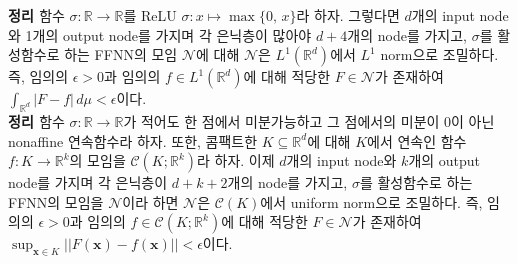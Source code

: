 \documentclass[10pt,onecolumn,twoside,a4size]{gsag3jnl}
\begin{document}
\noindent\textsf{\textbf{정리 \citep{hanin2017approximating}} 함수 $\sigma:\mathbb{R}\to\mathbb{R}$를 ReLU $\sigma:x\mapsto\max\{0,\,x\}$라 하자. 그렇다면 $d$개의 input node와 1개의 output node를 가지며 각 은닉층이 많아야 $d+4$개의 node를 가지고, $\sigma$를 활성함수로 하는 FFNN의 모임 $\mathcal{N}$에 대해 $\mathcal{N}$은 $L^1(\mathbb{R}^d)$에서 $L^1$ norm으로 조밀하다. 즉, 임의의 $\epsilon>0$과 임의의 $f\in L^1(\mathbb{R}^d)$에 대해 적당한 $F\in\mathcal{N}$가 존재하여 $\int_{\mathbb{R}^d}|F-f|\,d\mu<\epsilon$이다.}\\

\noindent\textsf{\textbf{정리 \citep{kidger2019universal}} 함수 $\sigma:\mathbb{R}\to\mathbb{R}$가 적어도 한 점에서 미분가능하고 그 점에서의 미분이 0이 아닌 nonaffine 연속함수라 하자. 또한, 콤팩트한 $K\subseteq\mathbb{R}^d$에 대해 $K$에서 연속인 함수 $f:K\to\mathbb{R}^k$의 모임을 $\mathcal{C}(K;\mathbb{R}^k)$라 하자. 이제 $d$개의 input node와 $k$개의 output node를 가지며 각 은닉층이 $d+k+2$개의 node를 가지고, $\sigma$를 활성함수로 하는 FFNN의 모임을 $\mathcal{N}$이라 하면 $\mathcal{N}$은 $\mathcal{C}(K)$에서 uniform norm으로 조밀하다. 즉, 임의의 $\epsilon>0$과 임의의 $f\in\mathcal{C}(K;\mathbb{R}^k)$에 대해 적당한 $F\in\mathcal{N}$가 존재하여 $\sup_{\mathbf{x}\in K}||F(\mathbf{x})-f(\mathbf{x})||<\epsilon$이다.}\\
\end{document}
